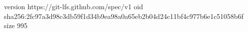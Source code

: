 version https://git-lfs.github.com/spec/v1
oid sha256:2fc97a3d98c3db59f1d34b9ea98a0a65eb2b04d24c11bf4c977b6e1c51058b6f
size 995
